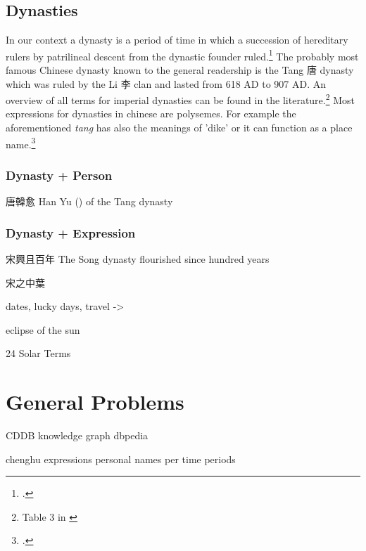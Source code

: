 \documentclass[12pt, draft]{article}
\begin{document}
\subsection{Dynasties}
In our context a dynasty is a period of time in which a succession of hereditary
rulers by patrilineal descent from the dynastic founder ruled.\footcite[3]{Wilkinson:2012} 
The probably most famous Chinese dynasty known to the general readership
is the Tang 唐 dynasty which was ruled by the Li 李 clan and lasted from 618 AD to 907 AD.
An overview of all terms for imperial dynasties can be found in the literature.\footnote{
Table 3 in \cite[4]{Wilkinson:2012}}
Most expressions for dynasties in chinese are polysemes. For example the aforementioned
\emph{tang} has also the meanings of 'dike' or it can function as a place name.\footcite[117]{Wang:2000}

\subsubsection{Dynasty + Person}
唐韓愈 Han Yu () of the Tang dynasty

\subsubsection{Dynasty + Expression}
宋興且百年 The Song dynasty flourished since hundred years

宋之中葉


dates, lucky days, travel ->

eclipse of the sun

24 Solar Terms

\section{General Problems}
CDDB
knowledge graph
dbpedia


chenghu expressions
personal names per time periods
\end{document}
